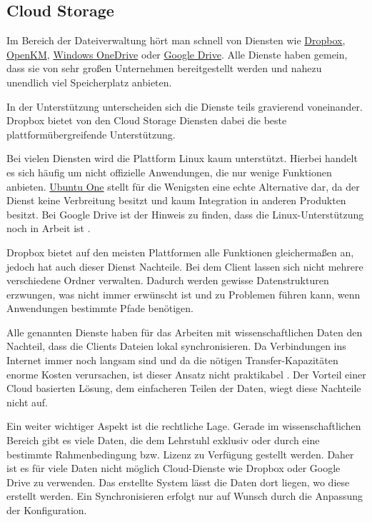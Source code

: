 \documentclass[oneside, ngerman, toc=bibliography,bibliography=totoc,listof=entryprefix, open=right,numbers=noenddot,fontsize=12pt]{scrbook}
\begin{document}
\subsection{Cloud Storage}
Im Bereich der Dateiverwaltung hört man schnell von Diensten wie \href{https://www.dropbox.com/de/}{{Dropbox}}, \href{http://www.openkm.com/en/}{{OpenKM}},
\href{https://onedrive.live.com/}{{Windows OneDrive}} oder  \href{https://www.google.com/intl/de_de/drive/}{{Google Drive}}.
Alle Dienste haben gemein, dass sie von sehr großen Unternehmen bereitgestellt werden und nahezu unendlich viel Speicherplatz anbieten. 

In der Unterstützung unterscheiden sich die Dienste teils gravierend voneinander. {Dropbox} bietet von den Cloud Storage Diensten dabei die beste plattformübergreifende Unterstützung.

Bei vielen Diensten wird die Plattform Linux kaum unterstützt. Hierbei handelt es sich häufig um nicht offizielle Anwendungen, die nur wenige Funktionen anbieten. \href{https://one.ubuntu.com/}{Ubuntu One} stellt für die Wenigsten eine echte Alternative dar, da der Dienst keine Verbreitung besitzt und kaum Integration in anderen Produkten besitzt. Bei {Google Drive} ist der Hinweis zu finden, dass die Linux-Unterstützung noch in Arbeit ist \cite{googledrive}.

{Dropbox} bietet auf den meisten Plattformen alle Funktionen gleichermaßen an, jedoch hat auch dieser Dienst Nachteile.
Bei dem Client lassen sich nicht mehrere verschiedene Ordner verwalten. Dadurch werden gewisse Datenstrukturen erzwungen, was nicht immer erwünscht ist und zu Problemen führen kann, wenn Anwendungen bestimmte Pfade benötigen.

Alle genannten Dienste haben für das Arbeiten mit wissenschaftlichen Daten den Nachteil, dass die Clients Dateien lokal synchronisieren. Da Verbindungen ins Internet immer noch langsam sind und da die nötigen Transfer-Kapazitäten enorme Kosten verursachen, ist dieser Ansatz nicht praktikabel \cite{telekomlahr}. Der Vorteil einer Cloud basierten Lösung, dem einfacheren Teilen der Daten, wiegt diese Nachteile nicht auf.

Ein weiter wichtiger Aspekt ist die rechtliche Lage. Gerade im wissenschaftlichen Bereich gibt es viele Daten, die dem Lehrstuhl exklusiv oder durch eine bestimmte Rahmenbedingung bzw. Lizenz zu Verfügung gestellt werden. 
Daher ist es für viele Daten nicht möglich Cloud-Dienste wie Dropbox oder Google Drive zu verwenden. 
Das erstellte System lässt die Daten dort liegen, wo diese erstellt werden. Ein Synchronisieren erfolgt nur auf Wunsch durch die Anpassung der Konfiguration.
\end{document}
